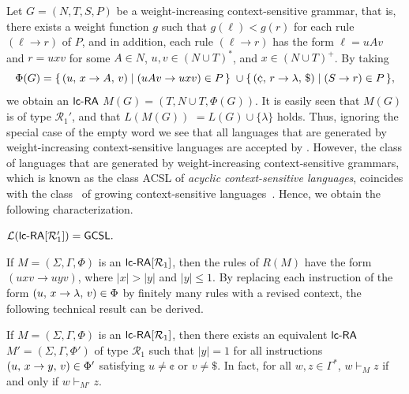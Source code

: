 Let $G=(N,T,S,P)$ be a weight-increasing context-sensitive grammar, that is, there exists a weight function $g$ such that $g(\ell) < g(r)$ for each rule $(\ell\to r)$ of $P$, and in addition, each rule $(\ell\to r)$ has the form $\ell=uAv$ and $r=uxv$ for some $A\in N$, $u,v\in(N\cup T)^*$, and $x\in (N\cup T)^+$. By taking
$$\Phi(G)  =  \{\,\rarule{u}{x}{A}{v} \mid (uAv\to uxv)\in P\,\}\; \cup
              \{\,\rarule{\cent}{r}{\lambda}{\$} \mid (S\to r)\in P\,\},$$
we obtain an $\lcRA$ $M(G) = (T,N\cup T,\Phi(G))$. It is easily seen that $M(G)$ is of type $\mathcal{R}_1'$, and that $L(M(G))$ $ = L(G)\cup\{\lambda\}$ holds. Thus, ignoring the special case of the empty word we see that all languages that are generated by weight-increasing context-sensitive languages are accepted by \lcRAp[1]. However, the class of languages that are generated by weight-increasing context-sensitive grammars, which is known as the class {\sf ACSL} of \emph{acyclic context-sensitive languages}, coincides with the class \GCSL\ of growing context-sensitive languages~\cite{NiWo01}. Hence, we obtain the following characterization.

\begin{theorem}\label{PropR1a}
${\mathcal L}(\lcRAp[1]) =  \GCSL.$
\end{theorem}

If $M = (\Sigma,\Gamma,\Phi)$ is an $\lcRA[1]$, then the rules of $R(M)$ have the form $(uxv \to uyv)$, where $|x|>|y|$ and $|y|\le 1$. By replacing each instruction of the form $(u,\,x\rightarrow\lambda,\,v)\in \Phi$ by finitely many rules with a revised context, the following technical result can be derived.

\begin{lemma}\label{LemR1a}
If $M = (\Sigma,\Gamma,\Phi)$ is an $\lcRA[1]$, then there exists an equivalent $\lcRA$ $M'=(\Sigma,\Gamma,\Phi')$ of type $\mathcal{R}_1$ such that $|y|=1$ for all instructions $(u,\,x\rightarrow y,\,v)\in \Phi'$ satisfying $u\not=\cent$ or $v\not=\$$. In fact, for all $w,z\in \Gamma^*$, $w\vdash_M z$ if and only if $w\vdash_{M'} z$.
\end{lemma}

